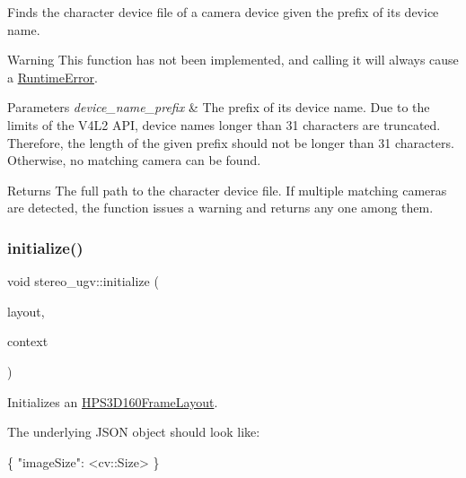 Finds the character device file of a camera device given the prefix of its device name. 

\begin{DoxyWarning}{Warning}
This function has not been implemented, and calling it will always cause a \hyperlink{classstereo__ugv_1_1RuntimeError}{Runtime\+Error}. 
\end{DoxyWarning}

\begin{DoxyParams}{Parameters}
{\em device\+\_\+name\+\_\+prefix} & The prefix of its device name. Due to the limits of the V4\+L2 A\+PI, device names longer than 31 characters are truncated. Therefore, the length of the given prefix should not be longer than 31 characters. Otherwise, no matching camera can be found. \\
\hline
\end{DoxyParams}
\begin{DoxyReturn}{Returns}
The full path to the character device file. If multiple matching cameras are detected, the function issues a warning and returns any one among them. 
\end{DoxyReturn}
\mbox{\label{namespacestereo__ugv_ac02cc03581ba53b911a9a7bd87f9a24c}} 
\subsubsection{\texorpdfstring{initialize()}{initialize()}\hspace{0.1cm}{\footnotesize\ttfamily [1/6]}}
{\footnotesize\ttfamily void stereo\+\_\+ugv\+::initialize (\begin{DoxyParamCaption}\item[{\hyperlink{classstereo__ugv_1_1HPS3D160FrameLayout}{H\+P\+S3\+D160\+Frame\+Layout} $\ast$}]{layout,  }\item[{const \hyperlink{classstereo__ugv_1_1Context}{Context} \&}]{context }\end{DoxyParamCaption})}



Initializes an \hyperlink{classstereo__ugv_1_1HPS3D160FrameLayout}{H\+P\+S3\+D160\+Frame\+Layout}. 

The underlying J\+S\+ON object should look like\+: 
\begin{DoxyCode}
\{
  \textcolor{stringliteral}{"imageSize"}: <cv::Size>
\}
\end{DoxyCode}
 
